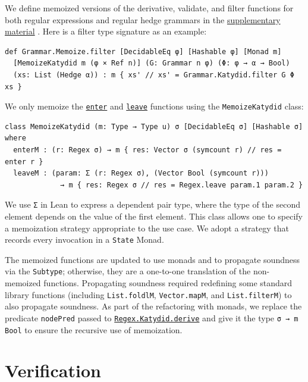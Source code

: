 \documentclass[runningheads]{llncs}
\newcommand{\link}[2]{\mbox{\hyperref[#2]{\lstinline{#1}}}\xspace}
\newcommand{\RegexKatydidDerive}{\link{Regex.Katydid.derive}{def Regex.Katydid.derive}}
\newcommand{\enter}{\link{enter}{def enter}}
\newcommand{\leave}{\link{leave}{def leave}}
\newcommand{\supplementarymaterial}{%
  \hyperref[supplementary_material]{supplementary material}\xspace%
}
\begin{document}
We define memoized versions of the derivative, validate, and filter functions for both regular expressions and regular hedge grammars in the \supplementarymaterial.
Here is a filter type signature as an example:
\begin{lstlisting}[label=def Grammar.Memoize.filter]
def Grammar.Memoize.filter [DecidableEq φ] [Hashable φ] [Monad m]
  [MemoizeKatydid m (φ × Ref n)] (G: Grammar n φ) (Φ: φ → α → Bool)
  (xs: List (Hedge α)) : m { xs' // xs' = Grammar.Katydid.filter G Φ xs }
\end{lstlisting}
We only memoize the \enter and \leave functions using the \lstinline{MemoizeKatydid} class:
\begin{lstlisting}[label=MemoizeKatydid]
class MemoizeKatydid (m: Type → Type u) σ [DecidableEq σ] [Hashable σ] where
  enterM : (r: Regex σ) → m { res: Vector σ (symcount r) // res = enter r }
  leaveM : (param: Σ (r: Regex σ), (Vector Bool (symcount r)))
             → m { res: Regex σ // res = Regex.leave param.1 param.2 }
\end{lstlisting}
We use \lstinline{Σ} in Lean to express a dependent pair type, where the type of the second element depends on the value of the first element.
This class allows one to specify a memoization strategy appropriate to the use case.
We adopt a strategy that records every invocation in a \lstinline{State} Monad.

The memoized functions are updated to use monads and to propagate soundness via the \lstinline{Subtype}; otherwise, they are a one-to-one translation of the non-memoized functions.
Propagating soundness required redefining some standard library functions (including \lstinline{List.foldlM}, \lstinline{Vector.mapM}, and \lstinline{List.filterM}) to also propagate soundness.
As part of the refactoring with monads, we replace the predicate \lstinline{nodePred} passed to \RegexKatydidDerive and give it the type \lstinline{σ → m Bool} to ensure the recursive use of memoization.

\section{Verification}
\label{section_verification}
\end{document}
